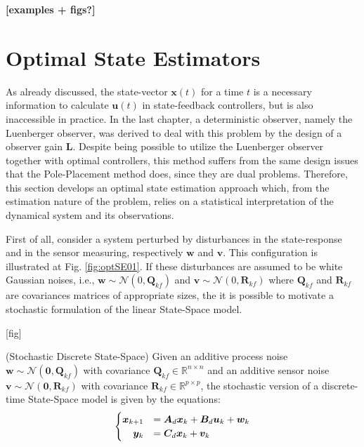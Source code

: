 \documentclass[a4paper,11pt]{book}
\numberwithin{figure}{chapter}
\numberwithin{equation}{chapter}
\numberwithin{table}{chapter}
\theoremstyle{definition}
\newtheorem{definition}{Definition}[chapter]
\newcounter{boxed-theorem}
\newcounter{boxed-definition}
\newenvironment{boxed-definition}[1]
{\begin{shaded} \begin{definition}{#1}}
{\end{definition} \end{shaded}}
\begin{document}
\textbf{[examples + figs?]}

\section{Optimal State Estimators}

As already discussed, the state-vector $\bm{x}(t)$ for a time $t$ is a necessary information to calculate $\bm{u}(t)$ in state-feedback controllers, but is also inaccessible in practice. In the last chapter, a deterministic observer, namely the Luenberger observer, was derived to deal with this problem by the design of a observer gain $\bm{L}$. Despite being possible to utilize the Luenberger observer together with optimal controllers, this method suffers from the same design issues that the Pole-Placement method does, since they are dual problems. Therefore, this section develops an optimal state estimation approach which, from the estimation nature of the problem, relies on a statistical interpretation of the dynamical system and its observations.

First of all, consider a system perturbed by disturbances in the state-response and in the sensor measuring, respectively $\bm{w}$ and $\bm{v}$. This configuration is illustrated at Fig. \ref{fig:optSE01}. If these disturbances are assumed to be white Gaussian noises, i.e., $\bm{w} \sim \mathcal{N}(0, \bm{Q}_{kf})$ and $\bm{v} \sim \mathcal{N}(0, \bm{R}_{kf})$ where $\bm{Q}_{kf}$ and $\bm{R}_{kf}$ are covariances matrices of appropriate sizes, the it is possible to motivate a stochastic formulation of the linear State-Space model.

[fig]

\begin{boxed-definition}{(Stochastic Discrete State-Space)} \label{def:stochSS}
	Given an additive process noise $\bm{w} \sim \mathcal{N}(\bm{0}, \bm{Q}_{kf})$ with covariance $\bm{Q}_{kf} \in \mathbb{R}^{n \times n}$ and an additive sensor noise $\bm{v} \sim \mathcal{N}(\bm{0}, \bm{R}_{kf})$ with covariance $\bm{R}_{kf} \in \mathbb{R}^{p \times p}$, the stochastic version of a discrete-time State-Space model is given by the equations:
	\begin{align}
	\begin{cases}
		\hfill \bm{x}_{k+1} &= \bm{A}_d \bm{x}_k + \bm{B}_d \bm{u}_k + \bm{w}_k \\
		\hfill \bm{y}_k &= \bm{C}_d \bm{x}_k + \bm{v}_k 
	\end{cases}
	\end{align}
\end{boxed-definition}
\end{document}

